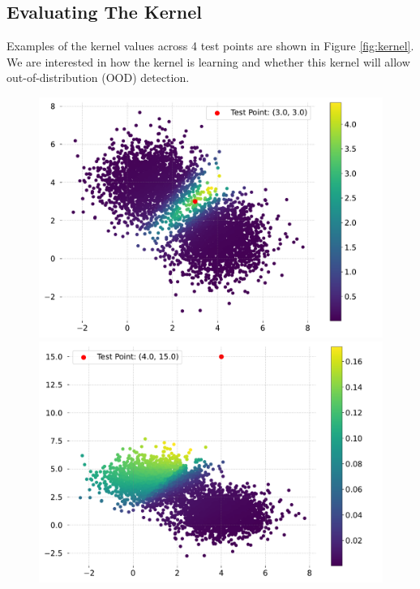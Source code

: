 \subsection{Evaluating The Kernel}

    Examples of the kernel values across 4 test points are shown in Figure \ref{fig:kernel}.
    We are interested in how the kernel is learning and whether this kernel will allow out-of-distribution (OOD) detection.

    \begin{figure}[!htb]
        \centering
        \begin{minipage}{0.45\textwidth}
            \centering
            \includegraphics[width=0.95\linewidth]{c3_figures/in_distribution_uncertan.pdf}
        \end{minipage}
            \begin{minipage}{0.45\textwidth}
                \centering
                \includegraphics[width=0.95\linewidth]{c3_figures/ood_positive_2.pdf}
            \end{minipage}


\end{figure}
